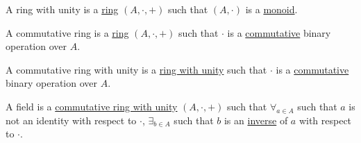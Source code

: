 \documentclass[crop=false,class=book]{standalone}
\begin{document}
\begin{definition}
\label{Definition:MathEnc:Analysis:Sum:RingUnit}
A ring with unity is a \hyperref[Definition:MathEnc:Analysis:Sum:Ring]{ring}
$(A,\cdot,+)$ such that $(A,\cdot)$ is a
\hyperref[Definition:MathEnc:Analysis:Sum:Monoid]{monoid}.
\end{definition}
\begin{definition}
\label{Definition:MathEnc:Analysis:Sum:ComRing}
A commutative ring is a \hyperref[Definition:MathEnc:Analysis:Sum:Ring]{ring}
$(A,\cdot,+)$ such that $\cdot$ is a
\hyperref[Definition:MathEnc:Analysis:Sum:CommunativeOperation]{commutative}
binary operation over $A$.
\end{definition}
\begin{definition}
\label{Definition:MathEnc:Analysis:Sum:ComRingUnit}
A commutative ring with unity is a 
\hyperref[Definition:MathEnc:Analysis:Sum:RingUnit]{ring with unity}
such that $\cdot$ is a
\hyperref[Definition:MathEnc:Analysis:Sum:CommunativeOperation]{commutative}
binary operation over $A$.
\end{definition}
\begin{definition}
\label{Definition:MathEnc:Analysis:Sum:Field}
A field is a 
\hyperref[Definition:MathEnc:Analysis:Sum:ComRingUnit]
{commutative ring with unity} $(A,\cdot,+)$ such that $\forall_{a\in A}$
such that $a$ is not an identity with respect to $\cdot$, $\exists_{b\in A}$
such that $b$ is an
\hyperref[Definition:MathEnc:Analysis:Sum:Inverse]{inverse} of $a$ with
respect to $\cdot$.
\end{definition}
\end{document}
